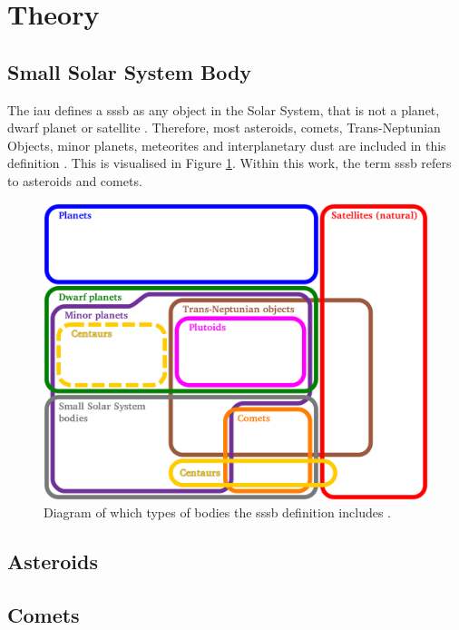 \section{Theory} \label{sec:theory}
%
%
%
%

\subsection{Small Solar System Body}
The \gls{iau} defines a \gls{sssb} as any object in the Solar System, that is not a planet, dwarf planet or satellite \cite{iau_sssb}. Therefore, most asteroids, comets, Trans-Neptunian Objects, minor planets, meteorites and interplanetary dust are included in this definition \cite{wiki:sssb}. This is visualised in Figure \ref{fig:sssb_diagram}. Within this work, the term \gls{sssb} refers to asteroids and comets.

\begin{figure}[htb]
    \centering
    \includegraphics[width=\textwidth]{doc/thesis/0_figures/Euler_diagram_of_solar_system_bodies.png}
    \caption{Diagram of which types of bodies the \gls{sssb} definition includes \cite{wiki:sssb}.}
    \label{fig:sssb_diagram}
\end{figure}

\subsection{Asteroids}

\subsection{Comets}